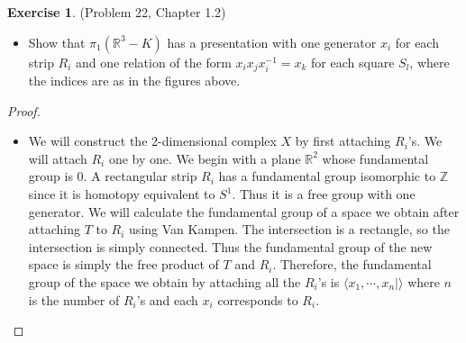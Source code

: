 \documentclass[12pt, psamsfonts]{amsart}
\theoremstyle{definition}
\newtheorem*{exer}{Exercise}
\theoremstyle{remark}
\numberwithin{equation}{section}
\begin{document}
\begin{exer}{(Problem 22, Chapter 1.2)}
  $ $
  \begin{itemize}
    \item
      Show that $\pi_1(\mathbb{R}^3 - K)$ has a presentation with one generator $x_i$ for each strip $R_i$ and one relation of the form $x_ix_jx_i^{-1} = x_k$ for each square $S_l$,
      where the indices are as in the figures above.
  \end{itemize}
\end{exer}

\begin{proof}
  $ $
  \begin{itemize}
    \item
      We will construct the 2-dimensional complex $X$ by first attaching $R_i$'s.
      We will attach $R_i$ one by one.
      We begin with a plane $\mathbb{R}^2$ whose fundamental group is $0$.
      A rectangular strip $R_i$ has a fundamental group isomorphic to $\mathbb{Z}$ since it is homotopy equivalent to $S^1$.
      Thus it is a free group with one generator.
      We will calculate the fundamental group of a space we obtain after attaching $T$ to $R_i$ using Van Kampen.
      The intersection is a rectangle, so the intersection is simply connected.
      Thus the fundamental group of the new space is simply the free product of $T$ and $R_i$.
      Therefore, the fundamental group of the space we obtain by attaching all the $R_i$'s is $\langle x_1, \cdots, x_n \mid \rangle$ where $n$ is the number of $R_i$'s and each $x_i$ corresponds to $R_i$.


\end{itemize}
\end{proof}
\end{document}
